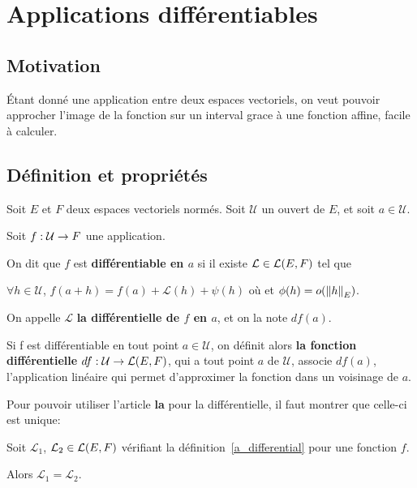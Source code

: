 \chapter{Applications différentiables}
\label{chapter_differential}
\section{Motivation}
	Étant donné une application entre deux espaces vectoriels, on veut pouvoir
	approcher l'image de la fonction sur un interval grace à une fonction
	affine, facile à calculer.


\section{Définition et propriétés}


\begin{definition} 
\label{a_differential}
	Soit $E$ et $F$ deux espaces vectoriels normés.
	Soit $\mathcal{U}$ un ouvert de $E$, et soit $a \in \mathcal{U}$.

	Soit $f : \mathcal{U} \rightarrow F$ une application.

	On dit que $f$ est \textbf{différentiable en $a$} si il existe $\mathcal{L}
	\in \mathcal{L}(E, F)$ tel que
	
	$\forall h \in \mathcal{U}$,
	$f(a + h) = f(a) + \mathcal{L}(h) + \psi(h)$ où
	et $\phi(h) = o(\norm{h}_{E})$.

\end{definition}

On appelle $\mathcal{L}$ \textbf{la différentielle de $f$ en $a$}, et on la note
$df(a)$.

Si f est différentiable en tout point $a \in \mathcal{U}$, on définit alors
\textbf{la fonction différentielle}
$df : \mathcal{U} \rightarrow \mathcal{L}(E, F)$, qui a tout point $a$
de $\mathcal{U}$, associe $df(a)$, l'application linéaire qui permet
d'approximer la fonction dans un voisinage de $a$.

Pour pouvoir utiliser l'article \textbf{la} pour la différentielle, il faut
montrer que celle-ci est unique:

\begin{proposition}
	Soit $\mathcal{L}_{1}$, $\mathcal{L}_{2} \in \mathcal{L}(E, F)$
	vérifiant la définition~\ref{a_differential} pour une fonction $f$.

	Alors $\mathcal{L}_{1} = \mathcal{L}_{2}$.
\end{proposition}

